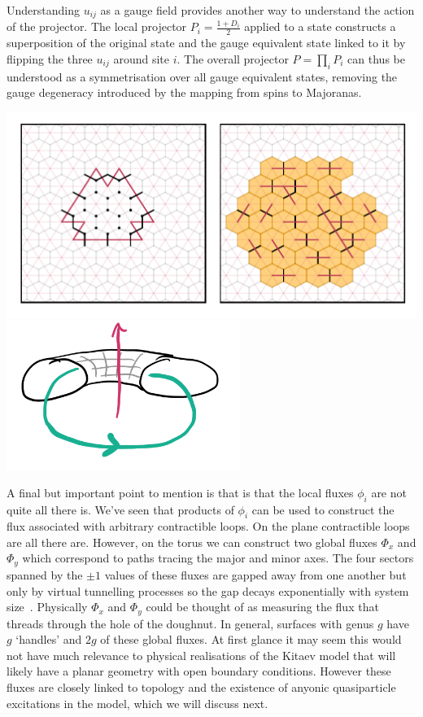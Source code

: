 Understanding \(u_{ij}\) as a gauge field provides another way to understand the action of the projector. The local projector \(P_i = \frac{1 + D_i}{2}\) applied to a state constructs a superposition of the original state and the gauge equivalent state linked to it by flipping the three \(u_{ij}\) around site \(i\). The overall projector \(P = \prod_i P_i\) can thus be understood as a symmetrisation over all gauge equivalent states, removing the gauge degeneracy introduced by the mapping from spins to Majoranas.

\includegraphics[width=1\textwidth,height=\textheight]{figure_code/amk_chapter/intro/flood_fill/flood_fill} \includegraphics[width=0.57\textwidth,height=\textheight]{figure_code/amk_chapter/topological_fluxes.png}

A final but important point to mention is that is that the local fluxes \(\phi_i\) are not quite all there is. We've seen that products of \(\phi_i\) can be used to construct the flux associated with arbitrary contractible loops. On the plane contractible loops are all there are. However, on the torus we can construct two global fluxes \(\Phi_x\) and \(\Phi_y\) which correspond to paths tracing the major and minor axes. The four sectors spanned by the \(\pm1\) values of these fluxes are gapped away from one another but only by virtual tunnelling processes so the gap decays exponentially with system size~\autocite{kitaevAnyonsExactlySolved2006}. Physically \(\Phi_x\) and \(\Phi_y\) could be thought of as measuring the flux that threads through the hole of the doughnut. In general, surfaces with genus \(g\) have \(g\) `handles' and \(2g\) of these global fluxes. At first glance it may seem this would not have much relevance to physical realisations of the Kitaev model that will likely have a planar geometry with open boundary conditions. However these fluxes are closely linked to topology and the existence of anyonic quasiparticle excitations in the model, which we will discuss next.

